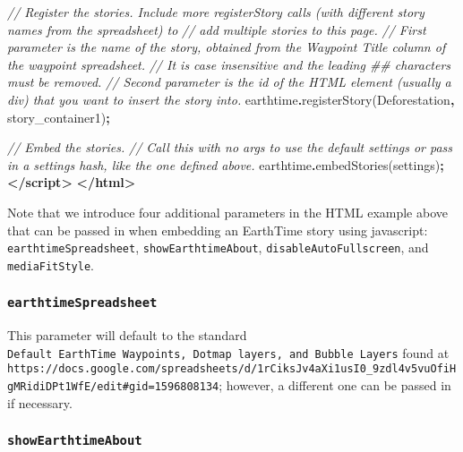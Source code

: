 \documentclass[
]{book}
\makeatletter
\newenvironment{Shaded}{\begin{snugshade}}{\end{snugshade}}
\newcommand{\CommentTok}[1]{\textcolor[rgb]{0.37,0.37,0.37}{\textit{#1}}}
\newcommand{\FunctionTok}[1]{\textcolor[rgb]{0,0,0}{#1}}
\newcommand{\KeywordTok}[1]{\textcolor[rgb]{0.27,0.27,0.27}{\textbf{#1}}}
\newcommand{\NormalTok}[1]{#1}
\newcommand{\OperatorTok}[1]{\textcolor[rgb]{0.43,0.43,0.43}{\textbf{#1}}}
\newcommand{\StringTok}[1]{\textcolor[rgb]{0.5,0.5,0.5}{#1}}
\newenvironment{kframe}{%
\medskip{}
\setlength{\fboxsep}{.8em}
 \def\at@end@of@kframe{}%
 \ifinner\ifhmode%
  \def\at@end@of@kframe{\end{minipage}}%
  \begin{minipage}{\columnwidth}%
 \fi\fi%
 \def\FrameCommand##1{\hskip\@totalleftmargin \hskip-\fboxsep
 \colorbox{shadecolor}{##1}\hskip-\fboxsep
     \hskip-\linewidth \hskip-\@totalleftmargin \hskip\columnwidth}%
 \MakeFramed {\advance\hsize-\width
   \@totalleftmargin\z@ \linewidth\hsize
   \@setminipage}}%
 {\par\unskip\endMakeFramed%
 \at@end@of@kframe}
\renewenvironment{Shaded}{\begin{kframe}}{\end{kframe}}
\makeatother
\begin{document}
\begin{Shaded}
\begin{Highlighting}[]
    \CommentTok{// Register the stories. Include more registerStory calls (with different story names from the spreadsheet) to }
    \CommentTok{// add multiple stories to this page.}
    \CommentTok{// First parameter is the name of the story, obtained from the \textquotesingle{}Waypoint Title\textquotesingle{} column of the waypoint spreadsheet. }
    \CommentTok{// It is case insensitive and the leading \textquotesingle{}\#\#\textquotesingle{} characters must be removed.}
    \CommentTok{// Second parameter is the id of the HTML element (usually a div) that you want to insert the story into.}
\NormalTok{    earthtime}\OperatorTok{.}\FunctionTok{registerStory}\NormalTok{(}\StringTok{\textquotesingle{}Deforestation\textquotesingle{}}\OperatorTok{,} \StringTok{\textquotesingle{}story\_container1\textquotesingle{}}\NormalTok{)}\OperatorTok{;}

    \CommentTok{// Embed the stories.}
    \CommentTok{// Call this with no args to use the default settings or pass in a settings hash, like the one defined above.}
\NormalTok{    earthtime}\OperatorTok{.}\FunctionTok{embedStories}\NormalTok{(settings)}\OperatorTok{;}
  \KeywordTok{\textless{}/script\textgreater{}}
\KeywordTok{\textless{}/html\textgreater{}}
\end{Highlighting}
\end{Shaded}

Note that we introduce four additional parameters in the HTML example above that can be passed in when embedding an EarthTime story using javascript: \texttt{earthtimeSpreadsheet}, \texttt{showEarthtimeAbout}, \texttt{disableAutoFullscreen}, and \texttt{mediaFitStyle}.

\hypertarget{earthtimespreadsheet}{%
\subsubsection*{\texorpdfstring{\texttt{earthtimeSpreadsheet}}{earthtimeSpreadsheet}}\label{earthtimespreadsheet}}


This parameter will default to the standard \texttt{Default\ EarthTime\ Waypoints,\ Dotmap\ layers,\ and\ Bubble\ Layers} found at \texttt{https://docs.google.com/spreadsheets/d/1rCiksJv4aXi1usI0\_9zdl4v5vuOfiHgMRidiDPt1WfE/edit\#gid=1596808134}; however, a different one can be passed in if necessary.

\hypertarget{showearthtimeabout}{%
\subsubsection*{\texorpdfstring{\texttt{showEarthtimeAbout}}{showEarthtimeAbout}}\label{showearthtimeabout}}
\end{document}
